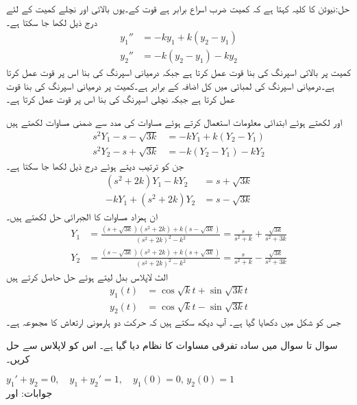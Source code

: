 حل:نیوٹن کا کلیہ کہتا ہے کہ کمیت ضرب اسراع برابر ہے قوت کے۔یوں بالائی اور نچلے کمیت کے لئے درج ذیل لکھا جا سکتا ہے۔
\begin{align*}
y_1''&=-ky_1+k(y_2-y_1)\\
y_2''&=-k(y_2-y_1)-ky_2
\end{align*} 
کمیت  پر بالائی اسپرنگ کی بنا  قوت عمل کرتا ہے جبکہ درمیانی اسپرنگ کی بنا اس پر  قوت عمل کرتا ہے۔درمیانی اسپرنگ کی لمبائی میں کل اضافہ  کے برابر ہے۔کمیت  پر درمیانی اسپرنگ کی بنا  قوت عمل کرتا ہے  جبکہ نچلی اسپرنگ کی بنا اس پر  قوت عمل کرتا ہے۔ 

 اور  لکھتے ہوئے ابتدائی معلومات استعمال کرتے ہوئے مساوات  کی مدد سے  ضمنی مساوات لکھتے ہیں
\begin{align*}
s^2Y_1-s-\sqrt{3k}&=-kY_1+k(Y_2-Y_1)\\
s^2Y_2-s+\sqrt{3k}&=-k(Y_2-Y_1)-kY_2
\end{align*}
جن کو ترتیب دیتے ہوئے درج ذیل لکھا جا سکتا ہے۔
\begin{align*}
(s^2+2k)Y_1-kY_2&=s+\sqrt{3k}\\
-kY_1+(s^2+2k)Y_2&=s-\sqrt{3k}
\end{align*}
ان ہمزاد مساوات کا الجبرائی حل لکھتے ہیں۔
\begin{align*}
Y_1&=\frac{(s+\sqrt{3k})(s^2+2k)+k(s-\sqrt{3k})}{(s^2+2k)^2-k^2}=\frac{s}{s^2+k}+\frac{\sqrt{3k}}{s^2+3k}\\
Y_2&=\frac{(s-\sqrt{3k})(s^2+2k)+k(s+\sqrt{3k})}{(s^2+2k)^2-k^2}=\frac{s}{s^2+k}-\frac{\sqrt{3k}}{s^2+3k}
\end{align*}
الٹ لاپلاس بدل لیتے ہوئے حل حاصل کرتے ہیں
\begin{align*}
y_1(t)&=\cos \sqrt{k}t+\sin{\sqrt{3k}t}\\
y_2(t)&=\cos \sqrt{k}t-\sin{\sqrt{3k}t}
\end{align*}
جس کو شکل  میں دکھایا گیا ہے۔ آپ دیکھ سکتے ہیں کہ حرکت دو ہارمونی ارتعاش کا مجموعہ ہے۔


سوال  تا سوال  میں سادہ تفرقی مساوات کا نظام دیا گیا ہے۔ اس کو لاپلاس سے حل کریں۔

\quad
$y_1'+y_2=0,\quad y_1+y_2'=1,\quad y_1(0)=0,\, y_2(0)=1$\\
جوابات: اور 

